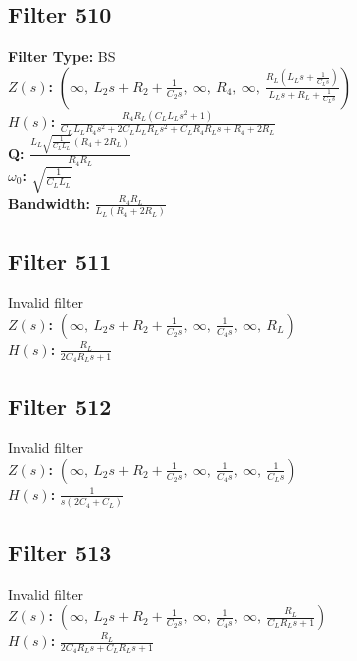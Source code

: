 \documentclass{article}
\begin{document}
\subsection*{Filter 510}
\textbf{Filter Type:} BS \\ 
\textbf{$Z(s)$:} $\left( \infty, \  L_{2} s + R_{2} + \frac{1}{C_{2} s}, \  \infty, \  R_{4}, \  \infty, \  \frac{R_{L} \left(L_{L} s + \frac{1}{C_{L} s}\right)}{L_{L} s + R_{L} + \frac{1}{C_{L} s}}\right)$ \\ 
\textbf{$H(s)$:} $\frac{R_{4} R_{L} \left(C_{L} L_{L} s^{2} + 1\right)}{C_{L} L_{L} R_{4} s^{2} + 2 C_{L} L_{L} R_{L} s^{2} + C_{L} R_{4} R_{L} s + R_{4} + 2 R_{L}}$ \\ 
\textbf{Q:} $\frac{L_{L} \sqrt{\frac{1}{C_{L} L_{L}}} \left(R_{4} + 2 R_{L}\right)}{R_{4} R_{L}}$ \\ 
\textbf{$\omega_0$:} $\sqrt{\frac{1}{C_{L} L_{L}}}$ \\ 
\textbf{Bandwidth:} $\frac{R_{4} R_{L}}{L_{L} \left(R_{4} + 2 R_{L}\right)}$ \\ 
\subsection*{Filter 511}
Invalid filter \\ 
\textbf{$Z(s)$:} $\left( \infty, \  L_{2} s + R_{2} + \frac{1}{C_{2} s}, \  \infty, \  \frac{1}{C_{4} s}, \  \infty, \  R_{L}\right)$ \\ 
\textbf{$H(s)$:} $\frac{R_{L}}{2 C_{4} R_{L} s + 1}$ \\ 
\subsection*{Filter 512}
Invalid filter \\ 
\textbf{$Z(s)$:} $\left( \infty, \  L_{2} s + R_{2} + \frac{1}{C_{2} s}, \  \infty, \  \frac{1}{C_{4} s}, \  \infty, \  \frac{1}{C_{L} s}\right)$ \\ 
\textbf{$H(s)$:} $\frac{1}{s \left(2 C_{4} + C_{L}\right)}$ \\ 
\subsection*{Filter 513}
Invalid filter \\ 
\textbf{$Z(s)$:} $\left( \infty, \  L_{2} s + R_{2} + \frac{1}{C_{2} s}, \  \infty, \  \frac{1}{C_{4} s}, \  \infty, \  \frac{R_{L}}{C_{L} R_{L} s + 1}\right)$ \\ 
\textbf{$H(s)$:} $\frac{R_{L}}{2 C_{4} R_{L} s + C_{L} R_{L} s + 1}$ \\ 
\end{document}
